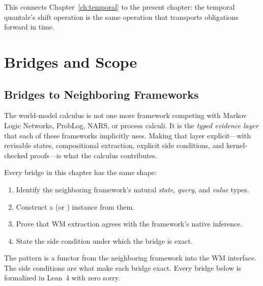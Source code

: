 \documentclass[11pt,openany]{report}
\begin{document}
\noindent
This connects Chapter~\ref{ch:temporal} to the present chapter:
the temporal quantale's shift operation is the same operation that
transports obligations forward in time.



\part{Bridges and Scope}
\label{part:bridges}

\chapter{Bridges to Neighboring Frameworks}
\label{ch:bridges}

The world-model calculus is not one more framework competing with
Markov Logic Networks, ProbLog, NARS, or process calculi.  It is the
\emph{typed evidence layer} that each of these frameworks implicitly
uses.  Making that layer explicit---with revisable states,
compositional extraction, explicit side conditions, and
kernel-checked proofs---is what the calculus contributes.

Every bridge in this chapter has the same shape:
\begin{enumerate}
\item Identify the neighboring framework's natural
  \emph{state}, \emph{query}, and \emph{value} types.
\item Construct a  (or )
  instance from them.
\item Prove that WM extraction agrees with the framework's
  native inference.
\item State the side condition under which the bridge is exact.
\end{enumerate}
The pattern is a functor from the neighboring framework into
the WM interface.  The side conditions are what make each
bridge exact.  Every bridge below is formalized in Lean~4
with zero sorry.
\end{document}
